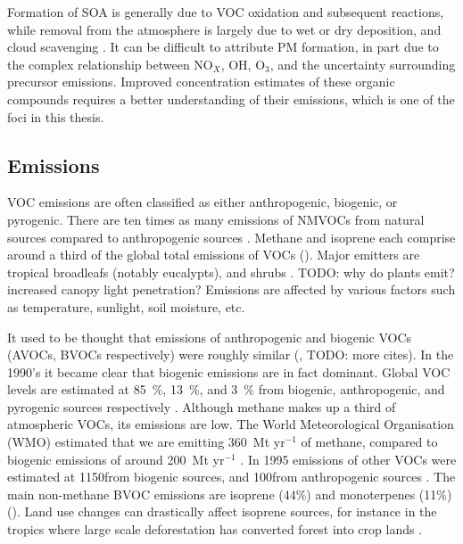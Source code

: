   Formation of SOA is generally due to VOC oxidation and subsequent reactions, while removal from the atmosphere is largely due to wet or dry deposition, and cloud scavenging \citep{Kanakidou2005}.
  It can be difficult to attribute PM formation, in part due to the complex relationship between NO$_X$, OH, O$_3$, and the uncertainty surrounding precursor emissions.
  Improved concentration estimates of these organic compounds requires a better understanding of their emissions, which is one of the foci in this thesis.
  
  \subsection{Emissions}
    \label{LR:VOCs:Emissions}
    
    VOC emissions are often classified as either anthropogenic, biogenic, or pyrogenic.
    There are ten times as many emissions of NMVOCs from natural sources compared to anthropogenic sources \citep{Guenther2006, Kanakidou2005, Millet2006}.
    Methane and isoprene each comprise around a third of the global total emissions of VOCs (\cite{Guenther2006}).
    Major emitters are tropical broadleafs (notably eucalypts), and shrubs \citep{Guenther2006, Arneth2008, Niinemets2010, Monks2015}.
    TODO: why do plants emit? increased canopy light penetration?
    Emissions are affected by various factors such as temperature, sunlight, soil moisture, etc.
    
    It used to be thought that emissions of anthropogenic and biogenic VOCs (AVOCs, BVOCs respectively) were roughly similar (\cite{Muller1992}, TODO: more cites).
    In the 1990's it became clear that biogenic emissions are in fact dominant. 
    Global VOC levels are estimated at 85~\%, 13~\%, and 3~\% from biogenic, anthropogenic, and pyrogenic sources respectively \citep{Kanakidou2005, Kefauver2014}.
    Although methane makes up a third of atmospheric VOCs, its emissions are low.
    The World Meteorological Organisation (WMO) estimated that we are emitting 360~Mt yr$^{-1}$ of methane, compared to biogenic emissions of around 200~Mt yr$^{-1}$ \citep{Atkinson2000}.
    In 1995 emissions of other VOCs were estimated at 1150\tgcpyr from biogenic sources, and 100\tgcpyr from anthropogenic sources \citep{Guenther1995, Atkinson2000}.
    The main non-methane BVOC emissions are isoprene (44\%) and monoterpenes (11\%) (\cite{Guenther2000, Kefauver2014}). 
    Land use changes can drastically affect isoprene sources, for instance in the tropics where large scale deforestation has converted forest into crop lands \citep{Kanakidou2005}.
    
